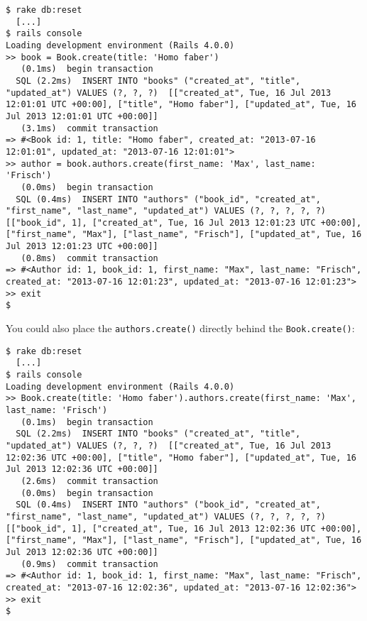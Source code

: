 \documentclass[a4paper]{book}
\begin{document}
\begin{shaded}\begin{verbatim}
$ rake db:reset
  [...]
$ rails console
Loading development environment (Rails 4.0.0)
>> book = Book.create(title: 'Homo faber')
   (0.1ms)  begin transaction
  SQL (2.2ms)  INSERT INTO "books" ("created_at", "title", "updated_at") VALUES (?, ?, ?)  [["created_at", Tue, 16 Jul 2013 12:01:01 UTC +00:00], ["title", "Homo faber"], ["updated_at", Tue, 16 Jul 2013 12:01:01 UTC +00:00]]
   (3.1ms)  commit transaction
=> #<Book id: 1, title: "Homo faber", created_at: "2013-07-16 12:01:01", updated_at: "2013-07-16 12:01:01">
>> author = book.authors.create(first_name: 'Max', last_name: 'Frisch')
   (0.0ms)  begin transaction
  SQL (0.4ms)  INSERT INTO "authors" ("book_id", "created_at", "first_name", "last_name", "updated_at") VALUES (?, ?, ?, ?, ?)  [["book_id", 1], ["created_at", Tue, 16 Jul 2013 12:01:23 UTC +00:00], ["first_name", "Max"], ["last_name", "Frisch"], ["updated_at", Tue, 16 Jul 2013 12:01:23 UTC +00:00]]
   (0.8ms)  commit transaction
=> #<Author id: 1, book_id: 1, first_name: "Max", last_name: "Frisch", created_at: "2013-07-16 12:01:23", updated_at: "2013-07-16 12:01:23">
>> exit
$
\end{verbatim}\end{shaded}

You could also place the \texttt{authors.create()} directly behind the \texttt{Book.create()}:

\begin{shaded}\begin{verbatim}
$ rake db:reset
  [...]
$ rails console
Loading development environment (Rails 4.0.0)
>> Book.create(title: 'Homo faber').authors.create(first_name: 'Max', last_name: 'Frisch')
   (0.1ms)  begin transaction
  SQL (2.2ms)  INSERT INTO "books" ("created_at", "title", "updated_at") VALUES (?, ?, ?)  [["created_at", Tue, 16 Jul 2013 12:02:36 UTC +00:00], ["title", "Homo faber"], ["updated_at", Tue, 16 Jul 2013 12:02:36 UTC +00:00]]
   (2.6ms)  commit transaction
   (0.0ms)  begin transaction
  SQL (0.4ms)  INSERT INTO "authors" ("book_id", "created_at", "first_name", "last_name", "updated_at") VALUES (?, ?, ?, ?, ?)  [["book_id", 1], ["created_at", Tue, 16 Jul 2013 12:02:36 UTC +00:00], ["first_name", "Max"], ["last_name", "Frisch"], ["updated_at", Tue, 16 Jul 2013 12:02:36 UTC +00:00]]
   (0.9ms)  commit transaction
=> #<Author id: 1, book_id: 1, first_name: "Max", last_name: "Frisch", created_at: "2013-07-16 12:02:36", updated_at: "2013-07-16 12:02:36">
>> exit
$
\end{verbatim}\end{shaded}
\end{document}
